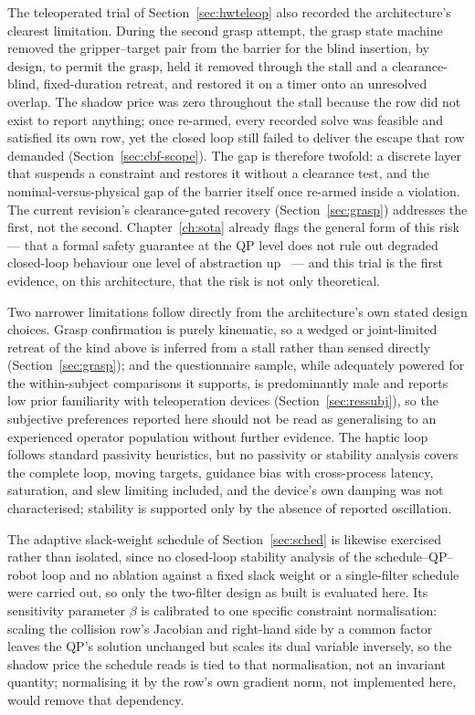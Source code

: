 \documentclass[12pt,a4paper,twoside,openright]{report}
\begin{document}
The teleoperated trial of Section~\ref{sec:hwteleop} also recorded the architecture's clearest limitation. During the second grasp attempt, the grasp state machine removed the gripper--target pair from the barrier for the blind insertion, by design, to permit the grasp, held it removed through the stall and a clearance-blind, fixed-duration retreat, and restored it on a timer onto an unresolved overlap. The shadow price was zero throughout the stall because the row did not exist to report anything; once re-armed, every recorded solve was feasible and satisfied its own row, yet the closed loop still failed to deliver the escape that row demanded (Section~\ref{sec:cbf-scope}). The gap is therefore twofold: a discrete layer that suspends a constraint and restores it without a clearance test, and the nominal-versus-physical gap of the barrier itself once re-armed inside a violation. The current revision's clearance-gated recovery (Section~\ref{sec:grasp}) addresses the first, not the second. Chapter~\ref{ch:sota} already flags the general form of this risk --- that a formal safety guarantee at the QP level does not rule out degraded closed-loop behaviour one level of abstraction up~\cite{reis2021undesirable} --- and this trial is the first evidence, on this architecture, that the risk is not only theoretical.

Two narrower limitations follow directly from the architecture's own stated design choices. Grasp confirmation is purely kinematic, so a wedged or joint-limited retreat of the kind above is inferred from a stall rather than sensed directly (Section~\ref{sec:grasp}); and the questionnaire sample, while adequately powered for the within-subject comparisons it supports, is predominantly male and reports low prior familiarity with teleoperation devices (Section~\ref{sec:ressubj}), so the subjective preferences reported here should not be read as generalising to an experienced operator population without further evidence. The haptic loop follows standard passivity heuristics, but no passivity or stability analysis covers the complete loop, moving targets, guidance bias with cross-process latency, saturation, and slew limiting included, and the device's own damping was not characterised; stability is supported only by the absence of reported oscillation.

The adaptive slack-weight schedule of Section~\ref{sec:sched} is likewise exercised rather than isolated, since no closed-loop stability analysis of the schedule--QP--robot loop and no ablation against a fixed slack weight or a single-filter schedule were carried out, so only the two-filter design as built is evaluated here. Its sensitivity parameter $\beta$ is calibrated to one specific constraint normalisation: scaling the collision row's Jacobian and right-hand side by a common factor leaves the QP's solution unchanged but scales its dual variable inversely, so the shadow price the schedule reads is tied to that normalisation, not an invariant quantity; normalising it by the row's own gradient norm, not implemented here, would remove that dependency.
\end{document}
